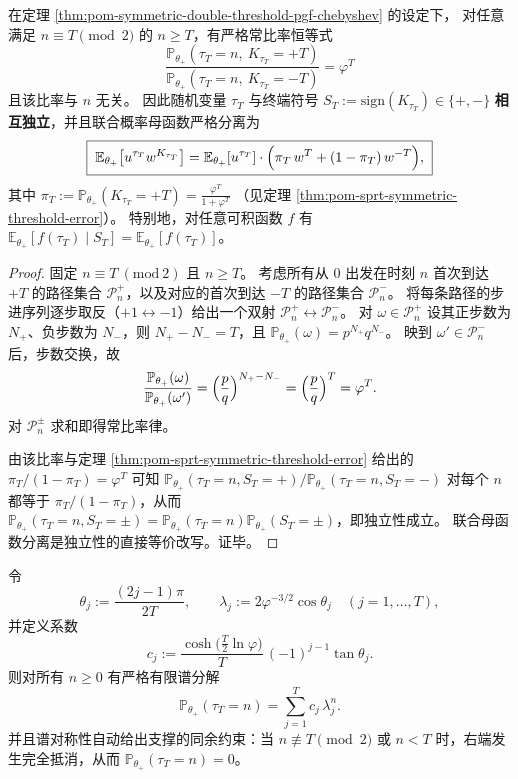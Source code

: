 \begin{proposition}\label{prop:pom-tau-terminal-sign-independence}
在定理 \ref{thm:pom-symmetric-double-threshold-pgf-chebyshev} 的设定下，
对任意满足 \(n\equiv T\pmod 2\) 的 \(n\ge T\)，有严格常比率恒等式
\[
\boxed{\;
\frac{\mathbb{P}_{\theta_+}(\tau_T=n,\ K_{\tau_T}=+T)}{\mathbb{P}_{\theta_+}(\tau_T=n,\ K_{\tau_T}=-T)}=\varphi^{T}\; }
\]
且该比率与 \(n\) 无关。
因此随机变量 \(\tau_T\) 与终端符号
\(
S_T:=\mathrm{sign}(K_{\tau_T})\in\{+,-\}
\)
\textbf{相互独立}，并且联合概率母函数严格分离为
\[
\boxed{\;
\mathbb{E}_{\theta_+}\!\left[u^{\tau_T}w^{K_{\tau_T}}\right]
=\mathbb{E}_{\theta_+}[u^{\tau_T}]\cdot\Bigl(\pi_T\,w^{T}+(1-\pi_T)\,w^{-T}\Bigr),\;}
\]
其中
\(
\pi_T:=\mathbb{P}_{\theta_+}(K_{\tau_T}=+T)=\frac{\varphi^{T}}{1+\varphi^{T}}
\)
（见定理 \ref{thm:pom-sprt-symmetric-threshold-error}）。
特别地，对任意可积函数 \(f\) 有
\(
\mathbb{E}_{\theta_+}[f(\tau_T)\mid S_T]=\mathbb{E}_{\theta_+}[f(\tau_T)]
\)。
\end{proposition}

\begin{proof}
固定 \(n\equiv T\ (\mathrm{mod}\ 2)\) 且 \(n\ge T\)。
考虑所有从 \(0\) 出发在时刻 \(n\) 首次到达 \(+T\) 的路径集合 \(\mathcal{P}_{n}^{+}\)，以及对应的首次到达 \(-T\) 的路径集合 \(\mathcal{P}_{n}^{-}\)。
将每条路径的步进序列逐步取反（\(+1\leftrightarrow -1\)）给出一个双射 \(\mathcal{P}_{n}^{+}\leftrightarrow \mathcal{P}_{n}^{-}\)。
对 \(\omega\in\mathcal{P}_n^{+}\) 设其正步数为 \(N_{+}\)、负步数为 \(N_{-}\)，则 \(N_{+}-N_{-}=T\)，且
\(
\mathbb{P}_{\theta_+}(\omega)=p^{N_{+}}q^{N_{-}}
\)。
映到 \(\omega'\in\mathcal{P}_n^{-}\) 后，步数交换，故
\[
\frac{\mathbb{P}_{\theta_+}(\omega)}{\mathbb{P}_{\theta_+}(\omega')}
=\Bigl(\frac{p}{q}\Bigr)^{N_{+}-N_{-}}
=\Bigl(\frac{p}{q}\Bigr)^{T}
=\varphi^{T}.
\]
对 \(\mathcal{P}_n^\pm\) 求和即得常比率律。
\par
由该比率与定理 \ref{thm:pom-sprt-symmetric-threshold-error} 给出的
\(
\pi_T/(1-\pi_T)=\varphi^T
\)
可知
\(
\mathbb{P}_{\theta_+}(\tau_T=n,S_T=+)/\mathbb{P}_{\theta_+}(\tau_T=n,S_T=-)
\)
对每个 \(n\) 都等于 \(\pi_T/(1-\pi_T)\)，从而
\(
\mathbb{P}_{\theta_+}(\tau_T=n,S_T=\pm)=\mathbb{P}_{\theta_+}(\tau_T=n)\mathbb{P}_{\theta_+}(S_T=\pm)
\)，即独立性成立。
联合母函数分离是独立性的直接等价改写。证毕。
\end{proof}

\begin{proposition}\label{prop:pom-tau-pmf-finite-spectral-decomposition}
令
\[
\theta_j:=\frac{(2j-1)\pi}{2T},\qquad
\lambda_j:=2\varphi^{-3/2}\cos\theta_j\quad (j=1,\dots,T),
\]
并定义系数
\[
c_j:=\frac{\cosh\!\bigl(\tfrac{T}{2}\ln\varphi\bigr)}{T}\,(-1)^{j-1}\tan\theta_j.
\]
则对所有 \(n\ge 0\) 有严格有限谱分解
\[
\boxed{\;\mathbb{P}_{\theta_+}(\tau_T=n)=\sum_{j=1}^{T} c_j\,\lambda_j^{n}.\;}
\]
并且谱对称性自动给出支撑的同余约束：当 \(n\not\equiv T\pmod 2\) 或 \(n<T\) 时，右端发生完全抵消，从而 \(\mathbb{P}_{\theta_+}(\tau_T=n)=0\)。
\end{proposition}

